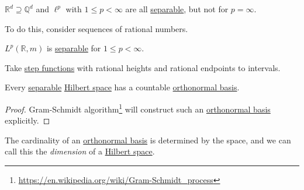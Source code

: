\begin{eg}
	\(\mathbb{R}^d \supseteq \mathbb{Q} ^d\) and \(\ell^p\) with \(1 \leq p < \infty\) are all \hyperref[def:separable]{separable},
	but not for \(p = \infty\).
\end{eg}
\begin{explanation}
	To do this, consider sequences of rational numbers.
\end{explanation}
\begin{eg}
	\(L^p(\mathbb{R},m)\) is \hyperref[def:separable]{separable} for \(1 \leq p < \infty\).
\end{eg}
\begin{explanation}
	Take \hyperref[def:step-function]{step functions} with rational heights and rational endpoints to intervals.
\end{explanation}
\begin{theorem}
	Every \hyperref[def:separable]{separable} \hyperref[def:Hilbert-space]{Hilbert space} has a countable \hyperref[def:orthonormal-basis]{orthonormal basis}.
\end{theorem}
\begin{proof}
	Gram-Schmidt algorithm\footnote{\url{https://en.wikipedia.org/wiki/Gram-Schmidt_process}} will construct such an \hyperref[def:orthonormal-basis]{orthonormal basis}
	explicitly.
\end{proof}

\begin{note}
	The cardinality of an \hyperref[def:orthonormal-basis]{orthonormal basis} is determined by the space, and we can call this the \emph{dimension} of a
	\hyperref[def:Hilbert-space]{Hilbert space}.
\end{note}
